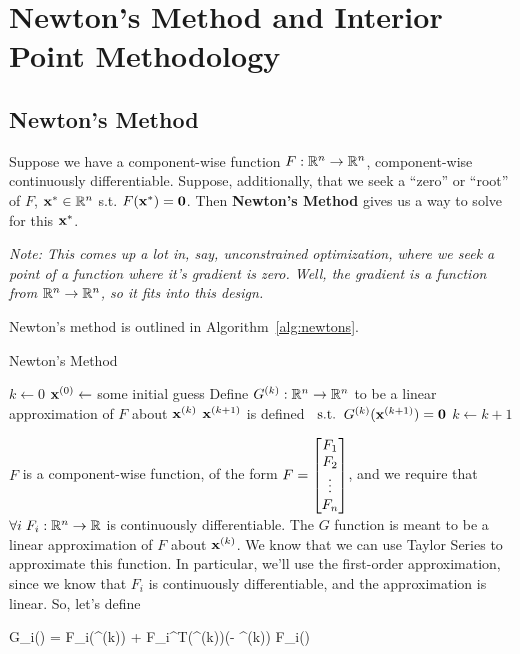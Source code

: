 \pagebreak
\section{Newton's Method and Interior Point Methodology}

\subsection{Newton's Method}

Suppose we have a component-wise function $F: \mathbb{R}^n \rightarrow \mathbb{R}^n$, component-wise continuously differentiable.
Suppose, additionally, that we seek a ``zero'' or ``root'' of 
$F$, $\mathbf{x}^* \in \mathbb{R}^n$ s.t.  $F(\mathbf{x}^*) = \mathbf{0}$.
Then \textbf{Newton's Method} gives us a way to solve for this $\mathbf{x}^*$.

\textit{Note: This comes up a lot in, say, unconstrained optimization, where we seek a point of
a function where it's gradient is zero. Well, the gradient is a function from 
$\mathbb{R}^n \rightarrow \mathbb{R}^n$, so it fits into this design.}

Newton's method is outlined in Algorithm~\ref{alg:newtons}.

\begin{algorithm}\label{alg:newtons}
\caption{Newton's Method}
	$k \leftarrow  0$\;
	$\mathbf{x}^{(0)}  \leftarrow $ some initial guess\;
	 {
		Define $G^{(k)}: \mathbb{R}^n \rightarrow \mathbb{R}^n$ to be a linear approximation of $F$ about $\mathbf{x}^{(k)}$\;
		$\mathbf{x}^{(k+1)}$ is defined  $\;\; \text{s.t.} \;\; G^{(k)}(\mathbf{x}^{(k+1)}) = \mathbf{0}$\;
		 $k \leftarrow k+1$
	}
\end{algorithm}

$F$ is a component-wise function, of the form 
$F = \begin{bmatrix} F_1 \\ F_2 \\ \vdots \\ F_n \end{bmatrix}$, and we require that $\forall i\;
F_i : \mathbb{R}^n \rightarrow \mathbb{R}$ is continuously differentiable.
The $G$ function is meant to be a linear approximation of $F$ about $\mathbf{x}^{(k)}$.
We know that we can use Taylor Series to approximate
this function. In particular, we'll use the first-order approximation, since we know
that $F_i$ is continuously differentiable, and the approximation is linear.
So, let's define
\begin{frml}
	G_i(\vx) = F_i(\vx^{(k)}) + \nabla F_i^T(\vx^{(k)})(\vx - \vx^{(k)}) \approx F_i(\vx)
\end{frml}


